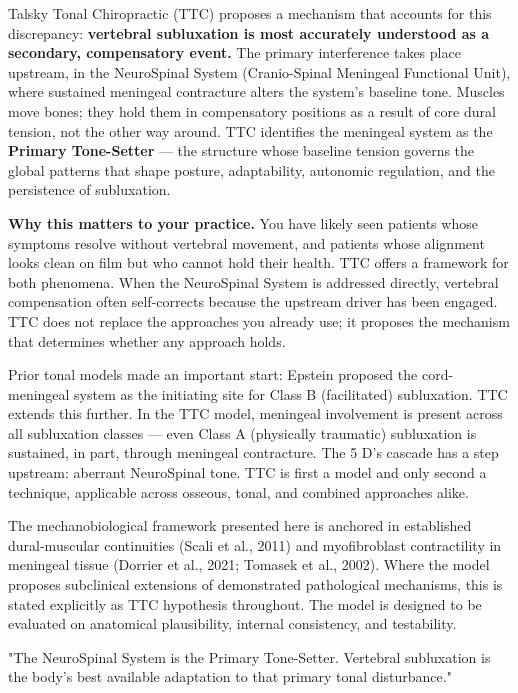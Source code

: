 \documentclass[11pt,letterpaper]{article}
\begin{document}
Talsky Tonal Chiropractic (TTC) proposes a mechanism that accounts for this discrepancy: \textbf{vertebral subluxation is most accurately understood as a secondary, compensatory event.} The primary interference takes place upstream, in the NeuroSpinal System (Cranio-Spinal Meningeal Functional Unit), where sustained meningeal contracture alters the system's baseline tone. Muscles move bones; they hold them in compensatory positions as a result of core dural tension, not the other way around. TTC identifies the meningeal system as the \textbf{Primary Tone-Setter} — the structure whose baseline tension governs the global patterns that shape posture, adaptability, autonomic regulation, and the persistence of subluxation.


\textbf{Why this matters to your practice.} You have likely seen patients whose symptoms resolve without vertebral movement, and patients whose alignment looks clean on film but who cannot hold their health. TTC offers a framework for both phenomena. When the NeuroSpinal System is addressed directly, vertebral compensation often self-corrects because the upstream driver has been engaged. TTC does not replace the approaches you already use; it proposes the mechanism that determines whether any approach holds.


Prior tonal models made an important start: Epstein proposed the cord-meningeal system as the initiating site for Class B (facilitated) subluxation. TTC extends this further. In the TTC model, meningeal involvement is present across all subluxation classes — even Class A (physically traumatic) subluxation is sustained, in part, through meningeal contracture. The 5 D's cascade has a step upstream: aberrant NeuroSpinal tone. TTC is first a model and only second a technique, applicable across osseous, tonal, and combined approaches alike.


The mechanobiological framework presented here is anchored in established dural-muscular continuities (Scali et al., 2011) and myofibroblast contractility in meningeal tissue (Dorrier et al., 2021; Tomasek et al., 2002). Where the model proposes subclinical extensions of demonstrated pathological mechanisms, this is stated explicitly as TTC hypothesis throughout. The model is designed to be evaluated on anatomical plausibility, internal consistency, and testability.


\begin{pullquotebox}
"The NeuroSpinal System is the Primary Tone-Setter. Vertebral subluxation is the body's best available adaptation to that primary tonal disturbance."
\end{pullquotebox}
\end{document}
